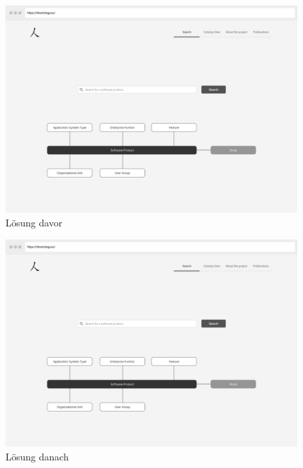 \begin{enumerate}
\begin{figure}[H]
	\centering
    	\includegraphics[width=1.45\textwidth, angle=-90]{Images/Startseite}
   	\caption{Lösung davor}
   	\label{fig:wireframe_start}
\end{figure}

\clearpage

\begin{figure}[H]
	\centering
    	\includegraphics[width=1.45\textwidth, angle=-90]{Images/Startseite}
   	\caption{Lösung danach}
   	\label{fig:wireframe_start}
\end{figure}

\clearpage

\end{enumerate}
